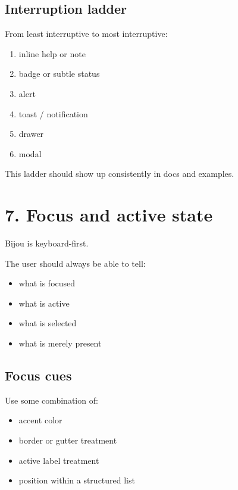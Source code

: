 \subsection{Interruption ladder}\label{record-021-interruption-ladder}

From least interruptive to most interruptive:

\begin{enumerate}
\def\labelenumi{\arabic{enumi}.}
\tightlist
\item
  inline help or note
\item
  badge or subtle status
\item
  alert
\item
  toast / notification
\item
  drawer
\item
  modal
\end{enumerate}

This ladder should show up consistently in docs and examples.

\section{7. Focus and active state}\label{record-021-focus-and-active-state}

Bijou is keyboard-first.

The user should always be able to tell:

\begin{itemize}
\tightlist
\item
  what is focused
\item
  what is active
\item
  what is selected
\item
  what is merely present
\end{itemize}

\subsection{Focus cues}\label{record-021-focus-cues}

Use some combination of:

\begin{itemize}
\tightlist
\item
  accent color
\item
  border or gutter treatment
\item
  active label treatment
\item
  position within a structured list
\end{itemize}

